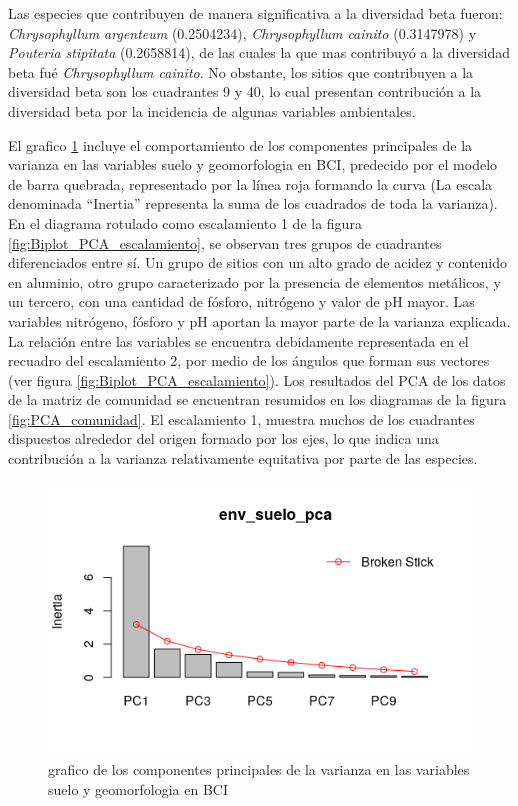 \documentclass[11pt,]{article}
\begin{document}
Las especies que contribuyen de manera significativa a la diversidad
beta fueron: \emph{Chrysophyllum argenteum} (0.2504234),
\emph{Chrysophyllum cainito} (0.3147978) y \emph{Pouteria stipitata}
(0.2658814), de las cuales la que mas contribuyó a la diversidad beta
fué \emph{Chrysophyllum cainito}. No obstante, los sitios que
contribuyen a la diversidad beta son los cuadrantes 9 y 40, lo cual
presentan contribución a la diversidad beta por la incidencia de algunas
variables ambientales.

El grafico \ref{fig:env_suelo_pca} incluye el comportamiento de los
componentes principales de la varianza en las variables suelo y
geomorfologia en BCI, predecido por el modelo de barra quebrada,
representado por la línea roja formando la curva (La escala denominada
``Inertia'' representa la suma de los cuadrados de toda la varianza). En
el diagrama rotulado como escalamiento 1 de la figura
\ref{fig:Biplot_PCA_escalamiento}, se observan tres grupos de cuadrantes
diferenciados entre sí. Un grupo de sitios con un alto grado de acidez y
contenido en aluminio, otro grupo caracterizado por la presencia de
elementos metálicos, y un tercero, con una cantidad de fósforo,
nitrógeno y valor de pH mayor. Las variables nitrógeno, fósforo y pH
aportan la mayor parte de la varianza explicada. La relación entre las
variables se encuentra debidamente representada en el recuadro del
escalamiento 2, por medio de los ángulos que forman sus vectores (ver
figura \ref{fig:Biplot_PCA_escalamiento}). Los resultados del PCA de los
datos de la matriz de comunidad se encuentran resumidos en los diagramas
de la figura \ref{fig:PCA_comunidad}. El escalamiento 1, muestra muchos
de los cuadrantes dispuestos alrededor del origen formado por los ejes,
lo que indica una contribución a la varianza relativamente equitativa
por parte de las especies.

\begin{figure}
\centering
\includegraphics{env_suelo_pca.png}
\caption{grafico de los componentes principales de la varianza en las
variables suelo y geomorfologia en BCI \label{fig:env_suelo_pca}}
\end{figure}
\end{document}
